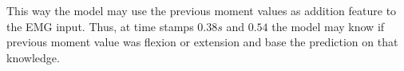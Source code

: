 \documentclass[../main.tex]{subfiles}
\begin{document}
This way the model may use the previous moment values as addition feature to the \ac{EMG} input.
Thus, at time stamps $0.38s$ and $0.54$ the model may know if previous moment value was flexion or extension and base the prediction on that knowledge.
\end{document}
